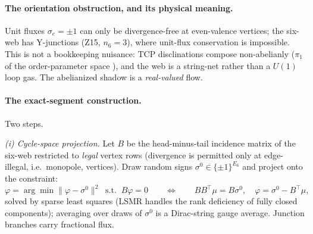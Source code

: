 \documentclass[11pt]{article}
\newcommand{\Nfk}{n_6}
\begin{document}
\paragraph{The orientation obstruction, and its physical meaning.} Unit
fluxes $\sigma_e = \pm 1$ can only be divergence-free at even-valence
vertices; the six-web has Y-junctions (Z15, $\Nfk = 3$), where unit-flux
conservation is impossible. This is not a bookkeeping nuisance: TCP
disclinations compose non-abelianly ($\pi_1$ of the order-parameter space
\cite{mermin}), and the web is a string-net rather than a $U(1)$ loop gas.
The abelianized shadow is a \emph{real-valued} flow.

\paragraph{The exact-segment construction.} Two steps.

\emph{(i) Cycle-space projection.} Let $B$ be the head-minus-tail incidence
matrix of the six-web restricted to \emph{legal} vertex rows (divergence is
permitted only at edge-illegal, i.e.\ monopole, vertices). Draw random signs
$\sigma^0 \in \{\pm1\}^{E_6}$ and project onto the constraint:
\begin{equation}
\varphi = \arg\min \|\varphi - \sigma^0\|^2
\;\;\text{s.t.}\;\; B\varphi = 0
\qquad\Longleftrightarrow\qquad
BB^{\!\top}\mu = B\sigma^0,\quad \varphi = \sigma^0 - B^{\!\top}\mu,
\end{equation}
solved by sparse least squares (LSMR handles the rank deficiency of fully
closed components); averaging over draws of $\sigma^0$ is a Dirac-string
gauge average. Junction branches carry fractional flux.
\end{document}
